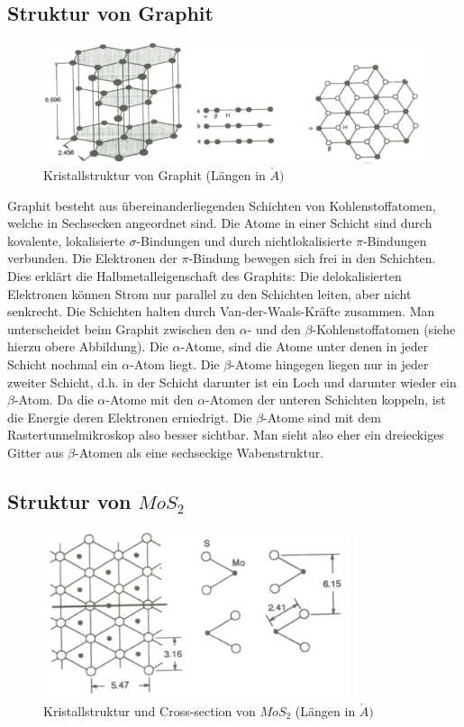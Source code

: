 \subsection{Struktur von Graphit}

\begin{figure}[H]
	\centering \includegraphics[width=\textwidth]{Bilder/Graphit.png}
	\caption{Kristallstruktur von Graphit (Längen in $\mathring{A})$}
\end{figure}

Graphit besteht aus übereinanderliegenden Schichten von Kohlenstoffatomen, welche in Sechsecken angeordnet sind. Die Atome in einer Schicht sind durch kovalente, lokalisierte $\sigma$-Bindungen und durch nichtlokalisierte $\pi$-Bindungen verbunden. Die Elektronen der $\pi$-Bindung bewegen sich frei in den Schichten. Dies erklärt die Halbmetalleigenschaft des Graphits: Die delokalisierten Elektronen können Strom nur parallel zu den Schichten leiten, aber nicht senkrecht. Die Schichten halten durch Van-der-Waals-Kräfte zusammen. Man unterscheidet beim Graphit zwischen den $\alpha$- und den $\beta$-Kohlenstoffatomen (siehe hierzu obere Abbildung). Die $\alpha$-Atome, sind die Atome unter denen in jeder Schicht nochmal ein $\alpha$-Atom liegt. Die $\beta$-Atome hingegen liegen nur in jeder zweiter Schicht, d.h. in der Schicht darunter ist ein Loch und darunter wieder ein $\beta$-Atom. Da die $\alpha$-Atome mit den $\alpha$-Atomen der unteren Schichten koppeln, ist die Energie deren Elektronen erniedrigt. Die $\beta$-Atome sind mit dem Rastertunnelmikroskop also besser sichtbar. Man sieht also eher ein dreieckiges Gitter aus $\beta$-Atomen als eine sechseckige Wabenstruktur.

\subsection{Struktur von $MoS_2$}

\begin{figure}[H]
	\centering \includegraphics[width=0.8\textwidth]{Bilder/MoS2.png}
	\caption{Kristallstruktur und Cross-section von $MoS_2$ (Längen in $\mathring{A})$}
\end{figure}

